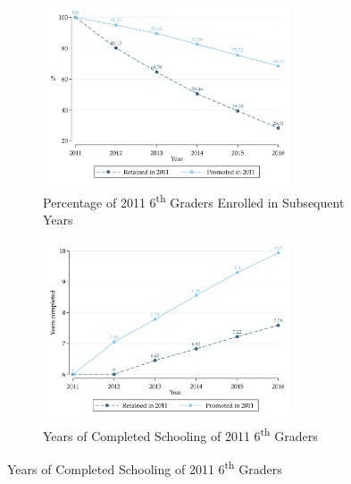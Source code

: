 \documentclass[11pt,a4paper]{article}
\begin{document}
\begin{figure}[ht!]
    \caption{6\textsuperscript{th} Grade Retention and Student Attainment}
    \captionsetup[subfigure]{position=top,justification=centering}
    \label{fig:retention_grade6}
    \centering
    
    \begin{subfigure}{\textwidth}
        \caption{Percentage of 2011 6\textsuperscript{th} Graders Enrolled in Subsequent Years}
        \label{fig:retention_grade6_dropout}
        \centering
        \includegraphics[width=0.8\textwidth]{DataWork/Output/Figures/fig1a-retention_grade6_dropout.png}
    \end{subfigure} 
     
    \begin{subfigure}{\textwidth}
        \caption{Years of Completed Schooling of 2011 6\textsuperscript{th} Graders}
        \label{fig:retention_grade6_education}
        \centering
        \includegraphics[width=0.8\textwidth]{DataWork/Output/Figures/fig1b-retention_grade6_education.png}
    \end{subfigure}  
     

\end{figure}
\end{document}
